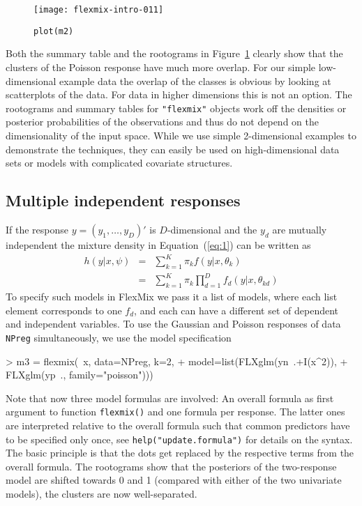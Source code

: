 \documentclass{jss}
\begin{document}
\begin{figure}[htbp]
  \centering
\texttt{[image: flexmix-intro-011]}
  \caption{\texttt{plot(m2)}}
  \label{fig:root2}
\end{figure}

Both the summary table and the rootograms in Figure~\ref{fig:root2}
clearly show that the clusters of the Poisson response have much more
overlap. For our simple low-dimensional example data the overlap of
the classes is obvious by looking at scatterplots of the data. For
data in higher dimensions this is not an option. The rootograms and
summary tables for \texttt{"flexmix"} objects work off the densities
or posterior probabilities of the observations and thus do not depend
on the dimensionality of the input space. While we use simple
2-dimensional examples to demonstrate the techniques, they can easily
be used on high-dimensional data sets or models with complicated
covariate structures.


\subsection{Multiple independent responses}
\label{sec:mult-indep-resp}


If the response $y=(y_1,\ldots,y_D)'$ is $D$-dimensional and the $y_d$
are mutually independent the mixture density in Equation~(\ref{eq:1})
can be written as
\begin{eqnarray*}
  h(y|x,\psi) &=& \sum_{k = 1}^K \pi_k
  f(y|x,\theta_k)\\
  &=&  \sum_{k = 1}^K \pi_k
  \prod_{d=1}^D f_d(y|x,\theta_{kd})
\end{eqnarray*}
To specify such models in FlexMix we pass it a list of models, where
each list element corresponds to one $f_d$, and each can have a
different set of dependent and independent variables.  To use the
Gaussian and Poisson responses of data \texttt{NPreg} simultaneously,
we use the model specification
\begin{Sinput}
> m3 = flexmix(~x, data=NPreg, k=2,
+              model=list(FLXglm(yn~.+I(x^2)), 
+                         FLXglm(yp~., family="poisson")))  
\end{Sinput}

Note that now three model formulas are involved: An overall formula as
first argument to function \texttt{flexmix()} and one formula per
response. The latter ones are interpreted relative to the overall
formula such that common predictors have to be specified only once,
see \texttt{help("update.formula")} for details on the syntax. The
basic principle is that the dots get replaced by the respective terms
from the overall formula. The rootograms show that the posteriors of
the two-response model are shifted towards 0 and 1 (compared with
either of the two univariate models), the clusters are now
well-separated.
\end{document}
